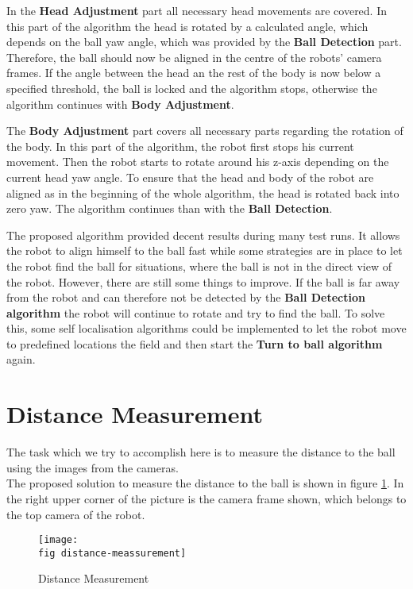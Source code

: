In the \textbf{Head Adjustment} part all necessary head movements are covered. 
In this part of the algorithm the head is rotated by a calculated angle, which depends on the ball yaw angle, which was provided by the \textbf{Ball Detection} part.
Therefore, the ball should now be aligned in the centre of the robots' camera frames.
If the angle between the head an the rest of the body is now below a specified threshold, the ball is locked and the algorithm stops, otherwise the algorithm continues with \textbf{Body Adjustment}. 

The \textbf{Body Adjustment} part covers all necessary parts regarding the rotation of the body.
In this part of the algorithm, the robot first stops his current movement. Then the robot starts to rotate around his z-axis depending on the current head yaw angle. To ensure that the head and body of the robot are aligned as in the beginning of the whole algorithm, the head is rotated back into zero yaw. The algorithm continues than with the \textbf{Ball Detection}.

The proposed algorithm provided decent results during many test runs. It allows the robot to align himself to the ball fast while some strategies are in place to let the robot find the ball for situations, where the ball is not in the direct view of the robot. However, there are still some things to improve. If the ball is far away from the robot and can therefore not be detected by the \textbf{Ball Detection algorithm} the robot will continue to rotate and try to find the ball. To solve this, some self localisation algorithms could be implemented to let the robot move to predefined locations the field and then start the \textbf{Turn to ball algorithm} again.

\section{Distance Measurement}
\label{j sec distance measurement}
The task which we try to accomplish here is to measure the distance to the ball using the images from the cameras. \\
The proposed solution to measure the distance to the ball is shown in figure \ref{j figure distance measurement}. In the right upper corner of the picture is the camera frame shown, which belongs to the top camera of the robot.
\begin{figure}[ht]
	\texttt{[image: \\fig distance-meassurement]}
	\caption{Distance Measurement}
	\label{j figure distance measurement}
\end{figure}


